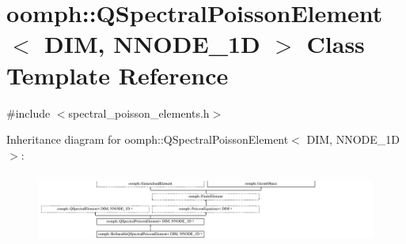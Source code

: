 \hypertarget{classoomph_1_1QSpectralPoissonElement}{}\section{oomph\+:\+:Q\+Spectral\+Poisson\+Element$<$ D\+IM, N\+N\+O\+D\+E\+\_\+1D $>$ Class Template Reference}
\label{classoomph_1_1QSpectralPoissonElement}


{\ttfamily \#include $<$spectral\+\_\+poisson\+\_\+elements.\+h$>$}

Inheritance diagram for oomph\+:\+:Q\+Spectral\+Poisson\+Element$<$ D\+IM, N\+N\+O\+D\+E\+\_\+1D $>$\+:\begin{figure}[H]
\begin{center}
\leavevmode
\includegraphics[height=2.380952cm]{classoomph_1_1QSpectralPoissonElement}
\end{center}
\end{figure}
